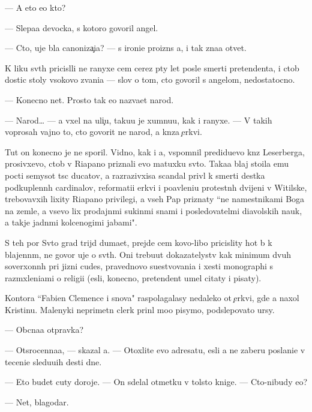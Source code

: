 \documentclass[10pt]{book}
\begin{document}
— A eto {\y}e{\x}o kto?

— Slepa{\y}a devocka, s kotoro{\y} govoril angel.

— Cto, uje b{\yi}la canoniza{\c}i{\y}a? — s ironi{\y}e{\y} proizn{\e}s {\y}a, i tak zna{\y}a otvet.

K liku sv{\ia}t{\yi}h pricisl{\ia}li ne ranyxe cem cerez p{\ia}ty let posle smerti pretendenta, i ctob{\yi} dostic stoly v{\yi}sokovo zvani{\y}a — slov o tom, cto govoril s angelom, nedostatocno.

— Konecno net. Prosto tak {\y}e{\y}o naz{\yi}va{\y}et narod.

— Narod… — {\Y}a v{\yi}xel na uli{\c}u, taku{\y}u je xumnu{\y}u, kak i ranyxe. — V takih voprosah vajno to, cto govorit ne narod, a kn{\ia}z{\y}a {\c}erkvi.

Tut on konecno je ne sporil. Vidno, kak i {\y}a, vspomnil predidu{\x}evo kn{\ia}z{\ia} Leserberga, prosivxevo, ctob{\yi} v Riapano priznali {\y}evo matuxku sv{\ia}to{\y}. Taka{\y}a blaj sto{\y}ila {\y}emu pocti semysot t{\yi}s{\ia}c ducatov, a razrazivxi{\y}sa scandal priv{\e}l k smerti des{\ia}tka podkuplenn{\yi}h cardinalov, reformati{\y}i {\C}erkvi i po{\y}avleni{\y}u protestn{\yi}h dvijeni{\y} v Witilske, trebovavxih lixity Riapano privilegi{\y}, a vseh Pap priznaty ``ne namestnikami Boga na zemle, a vsevo lix prodajn{\yi}mi sukin{\yi}mi s{\yi}nami i posledovatel{\ia}mi diavolskih nauk, a takje jadn{\yi}mi kolcenogimi jabami".

S teh por Sv{\ia}to{\y} grad trijd{\yi} duma{\y}et, prejde cem kovo-libo pricislity hot{\ia} b{\yi} k blajenn{\yi}m, ne govor{\ia} uje o sv{\ia}t{\yi}h. Oni trebu{\y}ut dokazatelystv kak minimum dvuh soverxonn{\yi}h pri jizni cudes, pravednovo su{\x}estvovani{\y}a i xesti monographi{\y} s razm{\yi}xleni{\y}ami o religi{\y}i ({\y}esli, konecno, pretendent umel citaty i pisaty).

Kontora ``Fabien Clemence i s{\yi}nov{\y}a" raspolagalasy nedaleko ot {\c}erkvi, gde {\y}a naxol Kristinu. Malenyki{\y} neprimetn{\yi}{\y} clerk prin{\ia}l mo{\y}o pisymo, podslepovato {\x}ur{\ia}sy.

— Ob{\yi}cna{\y}a otpravka?

— Otsrocenna{\y}a, — skazal {\y}a. — Otoxlite {\y}evo adresatu, {\y}esli {\y}a ne zaberu poslani{\y}e v teceni{\y}e sledu{\y}u{\x}ih des{\ia}ti dne{\y}.

— Eto budet cuty doroje. — On sdelal otmetku v tolsto{\y} knige. — Cto-nibudy {\y}e{\x}o?

— Net, blagodar{\io}.
\end{document}
